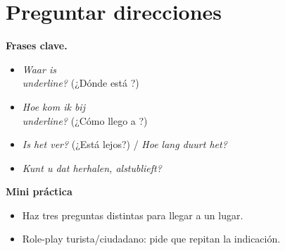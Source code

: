 \section{Preguntar direcciones}
\textbf{Frases clave.}
\begin{itemize}[leftmargin=*]
  \item \textit{Waar is \\underline{\hspace{1.2cm}}?} (¿Dónde está \underline{\hspace{1.2cm}}?)
  \item \textit{Hoe kom ik bij \\underline{\hspace{1.2cm}}?} (¿Cómo llego a \underline{\hspace{1.2cm}}?)
  \item \textit{Is het ver?} (¿Está lejos?) / \textit{Hoe lang duurt het?}
  \item \textit{Kunt u dat herhalen, alstublieft?}
\end{itemize}

\textbf{Mini práctica}
\begin{itemize}[leftmargin=*]
  \item Haz tres preguntas distintas para llegar a un lugar.
  \item Role-play turista/ciudadano: pide que repitan la indicación.
\end{itemize}
